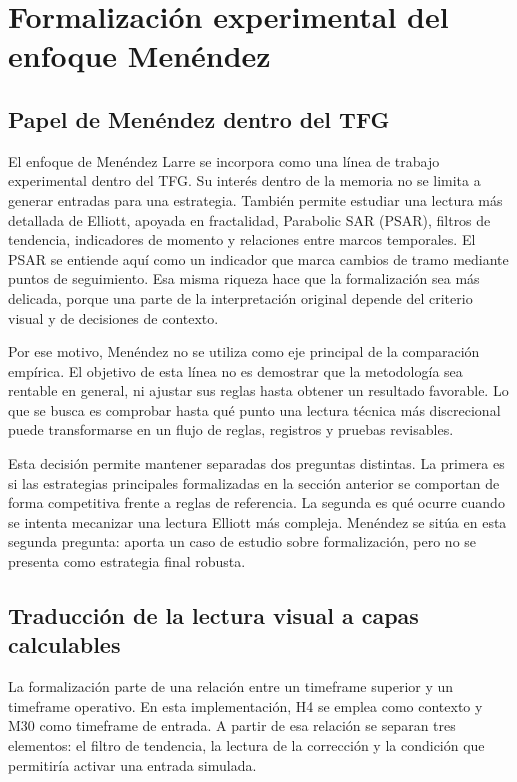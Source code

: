 \section{Formalizaci\'on experimental del enfoque Men\'endez}
\label{sec:formalizacion-menendez}

\subsection{Papel de Men\'endez dentro del TFG}
\label{subsec:papel-menendez-tfg}

El enfoque de Men\'endez Larre se incorpora como una l\'inea de trabajo
experimental dentro del TFG. Su inter\'es dentro de la memoria no se limita a
generar entradas para una estrategia. Tambi\'en permite estudiar una lectura
m\'as detallada de Elliott, apoyada en fractalidad, Parabolic SAR (PSAR),
filtros de tendencia, indicadores de momento y relaciones entre marcos
temporales. El PSAR se entiende aqu\'i como un indicador que marca cambios de
tramo mediante puntos de seguimiento. Esa
misma riqueza hace que la formalizaci\'on sea m\'as delicada, porque una parte de
la interpretaci\'on original depende del criterio visual y de decisiones de
contexto.

Por ese motivo, Men\'endez no se utiliza como eje principal de la comparaci\'on
emp\'irica. El objetivo de esta l\'inea no es demostrar que la metodolog\'ia sea
rentable en general, ni ajustar sus reglas hasta obtener un resultado favorable.
Lo que se busca es comprobar hasta qu\'e punto una lectura t\'ecnica m\'as
discrecional puede transformarse en un flujo de reglas, registros y pruebas
revisables.

Esta decisi\'on permite mantener separadas dos preguntas distintas. La primera
es si las estrategias principales formalizadas en la secci\'on anterior se
comportan de forma competitiva frente a reglas de referencia. La segunda es qu\'e
ocurre cuando se intenta mecanizar una lectura Elliott m\'as compleja. Men\'endez
se sit\'ua en esta segunda pregunta: aporta un caso de estudio sobre
formalizaci\'on, pero no se presenta como estrategia final robusta.

\subsection{Traducci\'on de la lectura visual a capas calculables}
\label{subsec:menendez-variantes-operables}

La formalizaci\'on parte de una relaci\'on entre un timeframe superior y un
timeframe operativo. En esta implementaci\'on, H4 se emplea como contexto y M30 como
timeframe de entrada. A partir de esa relaci\'on se separan tres elementos: el filtro
de tendencia, la lectura de la correcci\'on y la condici\'on que permitir\'ia
activar una entrada simulada.

